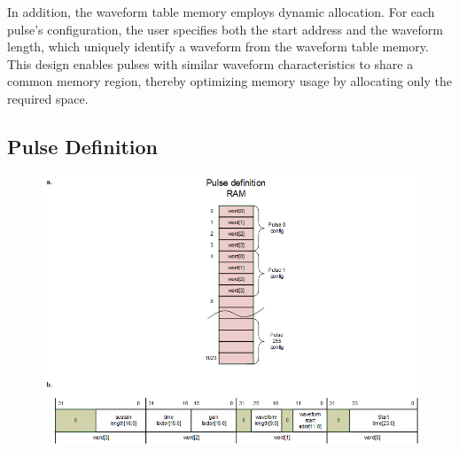 
In addition, the waveform table memory employs dynamic allocation. For each pulse's configuration, the user specifies both the start address and the waveform length, which uniquely identify a waveform from the waveform table memory. This design enables pulses with similar waveform characteristics to share a common memory region, thereby optimizing memory usage by allocating only the required space.

\subsection{Pulse Definition}
\begin{figure}[htbp]
    \centering
    \includegraphics[width=0.9\linewidth]{figures/3.2.png}
    \caption{}
    \label{fig:pd}
\end{figure}

